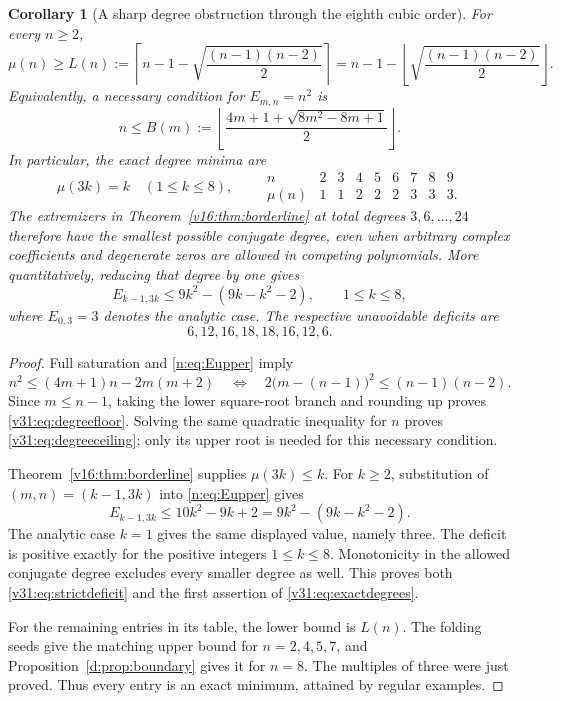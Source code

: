 \documentclass[UTF8,11pt]{ctexart}
\newtheorem{cor}[thm]{Corollary}
\theoremstyle{definition}
\numberwithin{equation}{section}
\begin{document}
\begin{cor}[A sharp degree obstruction through the eighth cubic order]
\label{v31:cor:minimumdegree}
For every $n\ge2$,
\begin{equation}\label{v31:eq:degreefloor}
 \mu(n)\ge L(n):=
 \left\lceil n-1-\sqrt{\frac{(n-1)(n-2)}2}\right\rceil
 =n-1-\left\lfloor\sqrt{\frac{(n-1)(n-2)}2}\right\rfloor.
\end{equation}
Equivalently, a necessary condition for $E_{m,n}=n^2$ is
\begin{equation}\label{v31:eq:degreeceiling}
 n\le B(m):=
 \left\lfloor\frac{4m+1+\sqrt{8m^2-8m+1}}2\right\rfloor.
\end{equation}
In particular, the exact degree minima are
\begin{equation}\label{v31:eq:exactdegrees}
 \mu(3k)=k\quad(1\le k\le8),\qquad
 \begin{array}{c|rrrrrrrr}
 n&2&3&4&5&6&7&8&9\\ \hline
 \mu(n)&1&1&2&2&2&3&3&3.
 \end{array}
\end{equation}
The extremizers in Theorem~\ref{v16:thm:borderline} at total
degrees $3,6,\ldots,24$ therefore have the smallest possible
conjugate degree, even when arbitrary complex coefficients and
degenerate zeros are allowed in competing polynomials.
More quantitatively, reducing that degree by one gives
\begin{equation}\label{v31:eq:strictdeficit}
 E_{k-1,3k}\le9k^2-(9k-k^2-2),\qquad 1\le k\le8,
\end{equation}
where $E_{0,3}=3$ denotes the analytic case. The respective
unavoidable deficits are
\[
                 6,12,16,18,18,16,12,6.
\]
\end{cor}
\begin{proof}
Full saturation and \eqref{n:eq:Eupper} imply
\[
 n^2\le(4m+1)n-2m(m+2)
 \quad\Longleftrightarrow\quad
 2\bigl(m-(n-1)\bigr)^2\le(n-1)(n-2).
\]
Since $m\le n-1$, taking the lower square-root branch and rounding
up proves \eqref{v31:eq:degreefloor}. Solving the same quadratic
inequality for $n$ proves \eqref{v31:eq:degreeceiling}; only its
upper root is needed for this necessary condition.

Theorem~\ref{v16:thm:borderline} supplies $\mu(3k)\le k$.
For $k\ge2$, substitution of $(m,n)=(k-1,3k)$ into
\eqref{n:eq:Eupper} gives
\[
 E_{k-1,3k}\le10k^2-9k+2
              =9k^2-(9k-k^2-2).
\]
The analytic case $k=1$ gives the same displayed value, namely
three. The deficit is positive exactly for the positive integers
$1\le k\le8$. Monotonicity in the allowed conjugate degree
excludes every smaller degree as well. This proves both
\eqref{v31:eq:strictdeficit} and the first assertion of
\eqref{v31:eq:exactdegrees}.

For the remaining entries in its table, the lower bound is
$L(n)$. The folding seeds give the matching upper bound for
$n=2,4,5,7$, and Proposition~\ref{d:prop:boundary} gives it for
$n=8$. The multiples of three were just proved. Thus every
entry is an exact minimum, attained by regular examples.
\end{proof}
\end{document}
